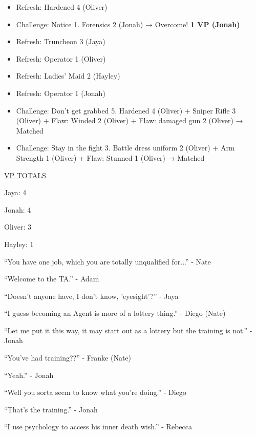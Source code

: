 \begin{itemize}
\item Refresh: Hardened 4 (Oliver)
\item Challenge: Notice 1.  Forensics 2 (Jonah) → Overcome! \textbf{1 VP (Jonah)}
\item Refresh: Truncheon 3 (Jaya)
\item Refresh: Operator 1 (Oliver)
\item Refresh: Ladies' Maid 2 (Hayley)
\item Refresh: Operator 1 (Jonah)
\item Challenge: Don't get grabbed 5.  Hardened 4 (Oliver) + Sniper Rifle 3 (Oliver) +  {\color[RGB]{255,0,0}Flaw: Winded 2 (Oliver)}  +  {\color[RGB]{255,0,0}Flaw: damaged gun 2 (Oliver)}  → Matched
\item Challenge: Stay in the fight 3.  Battle dress uniform 2 (Oliver) + Arm Strength 1 (Oliver) +  {\color[RGB]{255,0,0}Flaw: Stunned 1 (Oliver)}  → Matched
\end{itemize}





\underline{  {\LARGE VP TOTALS }  }

Jaya: 4

Jonah: 4

Oliver: 3

Hayley: 1





``You have one job, which you are totally unqualified for...'' - Nate

``Welcome to the TA.'' - Adam



``Doesn't anyone have, I don't know, 'eyesight'?'' - Jaya



``I guess becoming an Agent is more of a lottery thing.'' - Diego (Nate)

``Let me put it this way, it may start out as a lottery but the training is not.'' - Jonah

``You've had training??'' - Franke (Nate)

``Yeah.'' - Jonah

``Well you sorta seem to know what you're doing.'' - Diego

``That's the training.'' - Jonah



``I use psychology to access his inner death wish.'' - Rebecca



